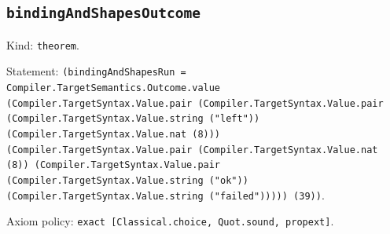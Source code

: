\documentclass[11pt]{article}
\begin{document}
\subsection*{\texttt{bindingAndShapesOutcome}}
\noindent Kind: \texttt{theorem}.\par
\noindent Statement: \texttt{(bindingAndShapesRun = Compiler.TargetSemantics.Outcome.value (Compiler.TargetSyntax.Value.pair (Compiler.TargetSyntax.Value.pair (Compiler.TargetSyntax.Value.string ("left")) (Compiler.TargetSyntax.Value.nat (8))) (Compiler.TargetSyntax.Value.pair (Compiler.TargetSyntax.Value.nat (8)) (Compiler.TargetSyntax.Value.pair (Compiler.TargetSyntax.Value.string ("ok")) (Compiler.TargetSyntax.Value.string ("failed"))))) (39))}.\par
\noindent Axiom policy: \texttt{exact [Classical.choice, Quot.sound, propext]}.\par
\end{document}
